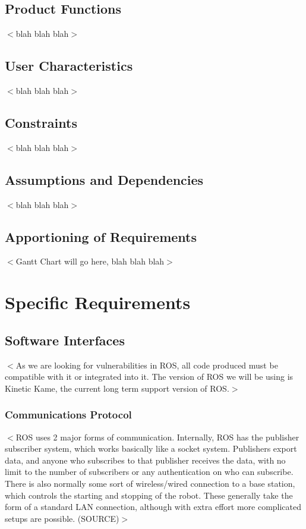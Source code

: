 \documentclass{scrreprt}
\begin{document}
\section{Product Functions}
$<$blah blah blah$>$

\section{User Characteristics}
$<$blah blah blah$>$

\section{Constraints}
$<$blah blah blah$>$

\section{Assumptions and Dependencies}
$<$blah blah blah$>$

\section{Apportioning of Requirements}
$<$Gantt Chart will go here, blah blah blah$>$


\chapter{Specific Requirements}

\section{Software Interfaces}
$<$As we are looking for vulnerabilities in ROS, all code produced must be compatible with it or integrated into it. The version of ROS we will be using is Kinetic Kame, the current long
term support version of ROS.$>$

\subsection{Communications Protocol}
$<$ROS uses 2 major forms of communication. Internally, ROS has the publisher subscriber system, which works basically like a socket system.
Publishers export data, and anyone who subscribes to that publisher receives the data, with no limit to the number of
subscribers or any authentication on who can subscribe. There is also normally some sort of wireless/wired connection to a base
station, which controls the starting and stopping of the robot. These generally take the form of a standard LAN connection,
although with extra effort more complicated setups are possible. (SOURCE)$>$
\end{document}

